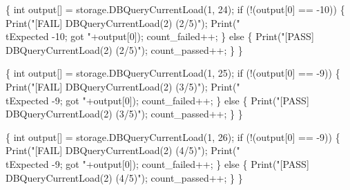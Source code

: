 \documentclass{article}
\def\nwendcode{\endtrivlist \endgroup}
\let\nwdocspar=\par
\begin{document}
\{
  int output[] = storage.DBQueryCurrentLoad(1, 24);
  if (!(output[0] == -10)) \{
    Print("[FAIL] DBQueryCurrentLoad(2) (2/5)");
    Print("\\tExpected -10; got "+output[0]);
    count_failed++;
  \} else \{
    Print("[PASS] DBQueryCurrentLoad(2) (2/5)");
    count_passed++;
  \}
\}
\nwendcode{}\nwdocspar
\nwenddocs{}\endmoddef{}
\{
  int output[] = storage.DBQueryCurrentLoad(1, 25);
  if (!(output[0] == -9)) \{
    Print("[FAIL] DBQueryCurrentLoad(2) (3/5)");
    Print("\\tExpected -9; got "+output[0]);
    count_failed++;
  \} else \{
    Print("[PASS] DBQueryCurrentLoad(2) (3/5)");
    count_passed++;
  \}
\}
\nwendcode{}\nwdocspar
\nwenddocs{}\endmoddef{}
\{
  int output[] = storage.DBQueryCurrentLoad(1, 26);
  if (!(output[0] == -9)) \{
    Print("[FAIL] DBQueryCurrentLoad(2) (4/5)");
    Print("\\tExpected -9; got "+output[0]);
    count_failed++;
  \} else \{
    Print("[PASS] DBQueryCurrentLoad(2) (4/5)");
    count_passed++;
  \}
\}
\nwendcode{}\nwdocspar
\end{document}
